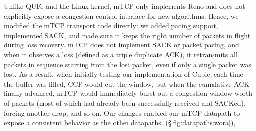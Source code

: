 

Unlike QUIC and the Linux kernel, mTCP only implements Reno and does not explicitly expose a congestion control interface for new algorithms. Hence, we modified the mTCP transport code directly:
we added pacing support, implemented SACK, and made sure it keeps the right number of packets in flight during loss recovery. 
%
mTCP does not implement SACK or packet pacing, and when it observes a loss (defined as a triple duplicate ACK), it retransmits all packets in sequence starting from the lost packet, even if only a single packet was lost. As a result, when initially testing our implementation of Cubic, each time the buffer was filled, CCP would cut the window, but when the cumulative ACK finally advanced, mTCP would immediately burst out a congestion window worth of packets (most of which had already been successfully received and SACKed), forcing another drop, and so on. Our changes enabled our mTCP datapath to expose a consistent behavior as the other datapaths. (\S\ref{fig:datapaths:wora}), 






